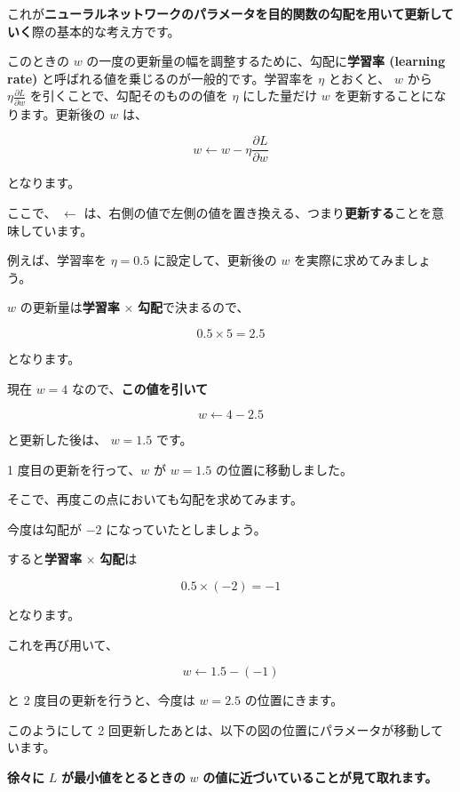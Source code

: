 これが\textbf{ニューラルネットワークのパラメータを目的関数の勾配を用いて更新していく}際の基本的な考え方です。

このときの $w$ の一度の更新量の幅を調整するために、勾配に\textbf{学習率 (learning rate)} と呼ばれる値を乗じるのが一般的です。学習率を $\eta$ とおくと、 $w$ から $\eta \frac{\partial L}{\partial w}$ を引くことで、勾配そのものの値を $\eta$  にした量だけ $w$ を更新することになります。更新後の $w$ は、


\[
w \leftarrow w - \eta \dfrac{\partial L}{\partial w}
\]


となります。

ここで、 $\leftarrow$ は、右側の値で左側の値を置き換える、つまり\textbf{更新する}ことを意味しています。


例えば、学習率を $\eta = 0.5$ に設定して、更新後の $w$ を実際に求めてみましょう。

$w$ の更新量は\textbf{学習率} $\times$ \textbf{勾配}で決まるので、


\[
0.5 \times 5 = 2.5
\]


となります。

現在 $w=4$ なので、\textbf{この値を引いて}


\[
w \leftarrow 4 - 2.5
\]


と更新した後は、 $w=1.5$ です。




1 度目の更新を行って、$w$ が $w = 1.5$ の位置に移動しました。

そこで、再度この点においても勾配を求めてみます。

今度は勾配が $-2$ になっていたとしましょう。

すると\textbf{学習率} $\times$ \textbf{勾配}は


\[
0.5 \times (-2) = -1
\]


となります。

これを再び用いて、


\[
w \leftarrow 1.5 - (-1)
\]


と 2 度目の更新を行うと、今度は $w = 2.5$ の位置にきます。

このようにして 2 回更新したあとは、以下の図の位置にパラメータが移動しています。




\textbf{徐々に} $L$ \textbf{が最小値をとるときの} $w$ \textbf{の値に近づいていることが見て取れます。}


